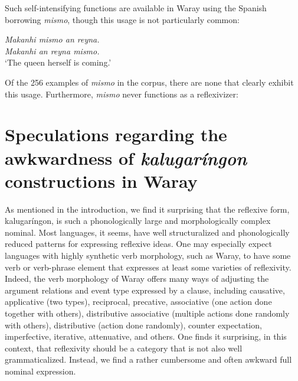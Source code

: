 \documentclass[output=paper]{langscibook}
\begin{document}
 
\z
\z


Such self-intensifying functions are available in Waray using the Spanish borrowing \textit{mismo}, though this usage is not particularly common: 

\ea
\label{ex:Payne:34}
\textit {Makanhi mismo an reyna.}\\
\textit {Makanhi an reyna mismo.}\\
\glt ‘The queen herself is coming.'
\z

Of the 256 examples of \textit{mismo} in the corpus, there are none that clearly exhibit this usage. Furthermore, \textit{mismo} never functions as a reflexivizer:

\z


\section{Speculations regarding the awkwardness of \textit{kalugaríngon} constructions in Waray}
\label{sec:Payne:9}


As mentioned in the introduction, we find it surprising that the reflexive form, {kalugaríngon}, is such a phonologically large and morphologically complex nominal. Most languages, it seems, have well structuralized and phonologically reduced patterns for expressing reflexive ideas. One may especially expect languages with highly synthetic verb morphology, such as Waray, to have some verb or verb-phrase element that expresses at least some varieties of reflexivity. Indeed, the verb morphology of Waray offers many ways of adjusting the argument relations and event type expressed by a clause, including causative, applicative (two types), reciprocal, precative, associative (one action done together with others), distributive associative (multiple actions done randomly with others), distributive (action done randomly), counter expectation, imperfective, iterative, attenuative, and others. One finds it surprising, in this context, that reflexivity should be a category that is not also well grammaticalized. Instead, we find a rather cumbersome and often awkward full nominal expression. 
\end{document}

